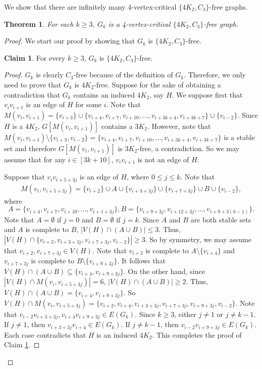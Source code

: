 \documentclass[11pt,a4paper]{article}
\newtheorem{theorem}{Theorem}[section]
\theoremstyle{definition}
\newtheorem{claim}{\indent Claim}
\begin{document}
We show that there are infinitely many 4-vertex-critical $\{4K_2,C_3\}$-free graphs.
\begin{theorem}\label{P11}
    For each $k\geq 3$, $G_k$ is a 4-vertex-critical $\{4K_2,C_3\}$-free graph. 
\end{theorem}
\begin{proof}
    We start our proof by showing that $G_k$ is $\{4K_2,C_3\}$-free. 
    \begin{claim}\label{claim:P_11 C_3-free}
        For every $k\geq 3$, $G_k$ is $\{4K_2,C_3\}$-free. 
    \end{claim}
    \begin{proof}
        $G_k$ is clearly $C_3$-free because of the definition of $G_k$. Therefore, we only need to prove that $G_k$ is $4K_2$-free. 
        Suppose for the sake of obtaining a contradiction that $G_k$ contains an induced $4K_2$, say $H$.  
        We suppose first that $v_iv_{i+1}$ is an edge of $H$ for some $i$.  
        Note that $M(v_i,v_{i+1})=\{v_{i+3}\}\cup \{v_{i+4},v_{i+7},v_{i+10},\ldots, v_{i+3k+4}, v_{i+3k+7}\}\cup \{v_{i-2}\}$. 
        Since $H$ is a $4K_2$, $G[M(v_i,v_{i+1})]$ contains a $3K_2$. 
        However, note that $M(v_i,v_{i+1}) \setminus \{v_{i+3},v_{i-2}\} =\{v_{i+4},v_{i+7},v_{i+10},\ldots, v_{i+3k+4}, v_{i+3k+7}\}$ is a stable set and therefore $G[M(v_i,v_{i+1})]$ is $3K_2$-free, a contradiction. So we may assume that for any $i\in [3k+10]$, $v_iv_{i+1}$ is not an edge of $H$. 
        
        Suppose that $v_iv_{i+5+3j}$ is an edge of $H$, where $0\leq j\leq k$. 
        Note that  
	\begin{equation}
		\begin{aligned}
			M(v_i,v_{i+5+3j})=\{v_{i+2}\}\cup A\cup \{v_{i+3+3j}\} \cup \{v_{i+7+3j}\}\cup B\cup \{v_{i-2}\},
		\end{aligned}
	\end{equation}
	where $$A=\{v_{i+4},v_{i+7},v_{i+10},\ldots, v_{i+1+3j}\}, B=\{v_{i+9+3j},v_{i+12+3j},\ldots, v_{i+9+3(k-1)}\}.$$ 
	Note that $A=\emptyset$ if $j=0$ and $B=\emptyset$ if $j=k$. 
    Since $A$ and $B$ are both stable sets and $A$ is complete to $B$, $|V(H)\cap (A\cup B)|\leq 3$. 
	Thus, $|V(H)\cap \{v_{i+2},v_{i+3+3j},v_{i+7+3j},v_{i-2}\}|\geq 3$. 
	So by symmetry, we may assume that $v_{i+2},v_{i+7+3j}\in V(H)$. Note that $v_{i+2}$ is complete to $A\setminus \{v_{i+4}\}$ and $v_{i+7+3j}$ is complete to $B\setminus \{v_{i+9+3j}\}$. 
    It follows that $V(H)\cap (A\cup B)\subseteq \{v_{i+4},v_{i+9+3j}\}$. 
    On the other hand, since $|V(H)\cap M(v_i,v_{i+5+3j})|=6$, $|V(H)\cap (A\cup B)|\geq 2$. 
    Thus, $V(H)\cap (A\cup B)=\{v_{i+4},v_{i+9+3j}\}$. 
    So $V(H)\cap M(v_i,v_{i+5+3j})=\{v_{i+2}, v_{i+4}, v_{i+3+3j}, v_{i+7+3j}, v_{i+9+3j}, v_{i-2}\}$. 
    Note that $v_{i-2}v_{i+3+3j},v_{i+4}v_{i+9+3j}\in E(G_k)$. 
    Since $k\geq 3$, either $j\neq 1$ or $j\neq k-1$. 
    If $j\neq 1$, then $v_{i+3+3j}v_{i+4}\in E(G_k)$. 
    If $j\neq k-1$, then $v_{i-2}v_{i+9+3j}\in E(G_k)$. 
    Each case contradicts that $H$ is an induced $4K_2$. 
    This completes the proof of Claim \ref{claim:P_11 C_3-free}.
    \end{proof}


\end{proof}
\end{document}
